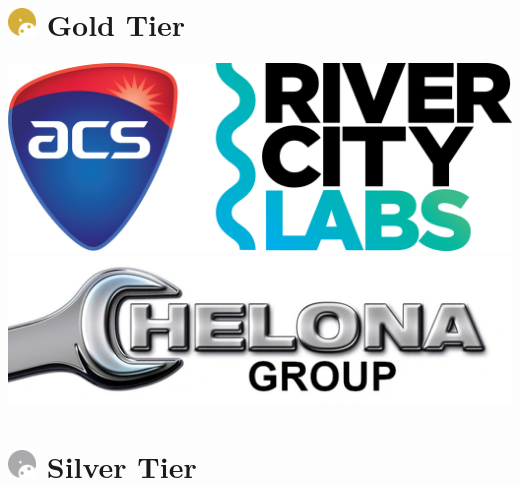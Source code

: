 \section{
    \includegraphics[width=1em]{../Assets/Partner Tier Icons/Gold.png}
    \textcolor{partner_gold}{Gold Tier}
}
\begin{multicols}{2}
    \includegraphics[width=0.9\linewidth]{partner-logos/ACS-RCL_Logo-Colour.png}
    \includegraphics[width=0.9\linewidth]{partner-logos/chelona.png}
\end{multicols}

\section{
    \includegraphics[width=1em]{../Assets/Partner Tier Icons/Silver.png}
    \textcolor{partner_silver}{Silver Tier}
}
\begin{multicols}{2}
\end{multicols}